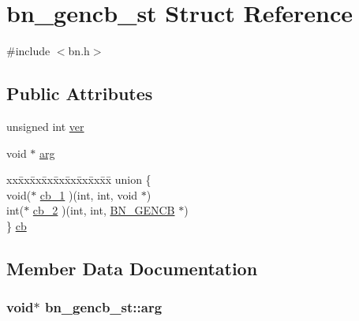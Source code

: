 \hypertarget{structbn__gencb__st}{}\section{bn\+\_\+gencb\+\_\+st Struct Reference}
\label{structbn__gencb__st}


{\ttfamily \#include $<$bn.\+h$>$}

\subsection*{Public Attributes}
\begin{DoxyCompactItemize}
\item 
unsigned int \hyperlink{structbn__gencb__st_a1c1ac893bd1f6ea3fcfa831fda085086}{ver}
\item 
void $\ast$ \hyperlink{structbn__gencb__st_a96626e1280d969f4848829c2713f22a7}{arg}
\item 
\begin{tabbing}
xx\=xx\=xx\=xx\=xx\=xx\=xx\=xx\=xx\=\kill
union \{\\
\>void($\ast$ \hyperlink{structbn__gencb__st_a34c3aa08f7f2f557fb7a51190673bec5}{cb\_1} )(int, int, void $\ast$)\\
\>int($\ast$ \hyperlink{structbn__gencb__st_a1460b7f2b52f128a2db8b8d6380e42cf}{cb\_2} )(int, int, \hyperlink{ossl__typ_8h_ae122a8be18f4fe821e5389381ececa09}{BN\_GENCB} $\ast$)\\
\} \hyperlink{structbn__gencb__st_a74fbfbe48965d4f55193f8b8f16ff51b}{cb}\\

\end{tabbing}\end{DoxyCompactItemize}


\subsection{Member Data Documentation}
\subsubsection[{\texorpdfstring{arg}{arg}}]{\setlength{\rightskip}{0pt plus 5cm}void$\ast$ bn\+\_\+gencb\+\_\+st\+::arg}\hypertarget{structbn__gencb__st_a96626e1280d969f4848829c2713f22a7}{}\label{structbn__gencb__st_a96626e1280d969f4848829c2713f22a7}
